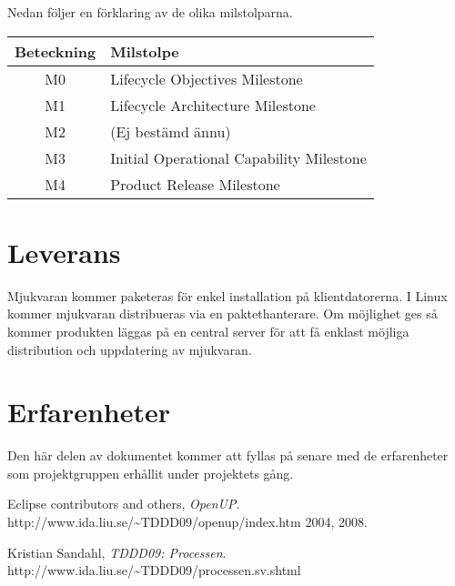 \emph{ }\linebreak
Nedan följer en förklaring av de olika milstolparna.

\begin{center}
	\begin{tabular}{| c | l |}
		\hline
		Beteckning & Milstolpe \\
		\hline
		M0 & Lifecycle Objectives Milestone \\
		\hline
		M1 & Lifecycle Architecture Milestone \\
		\hline
		M2 & (Ej bestämd ännu) \\
		\hline
		M3 & Initial Operational Capability Milestone \\
		\hline
		M4 & Product Release Milestone \\
		\hline
	\end{tabular}
\end{center}

\section{Leverans}
Mjukvaran kommer paketeras för enkel installation på klientdatorerna. I Linux kommer mjukvaran distribueras via en paktethanterare. Om möjlighet ges så kommer produkten läggas på en central server för att få enklast möjliga distribution och uppdatering av mjukvaran.

\section{Erfarenheter}
Den här delen av dokumentet kommer att fyllas på senare med de erfarenheter som projektgruppen erhållit under projektets gång.

\newpage

\begin{thebibliography}{9}
	Eclipse contributors and others,
	\emph{OpenUP}.
	http://www.ida.liu.se/\~{}TDDD09/openup/index.htm
	2004, 2008.

	Kristian Sandahl,
	\emph{TDDD09: Processen}.
	http://www.ida.liu.se/\~{}TDDD09/processen.sv.shtml
\end{thebibliography}



